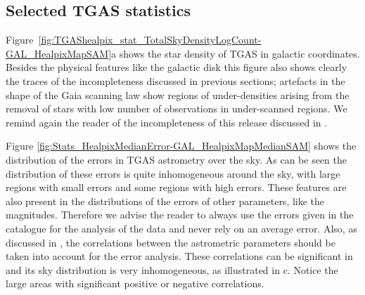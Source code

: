 

%



\subsection{Selected TGAS statistics}

Figure~\ref{fig:TGAShealpix_stat_TotalSkyDensityLogCount-GAL_HealpixMapSAM}a shows the star density of TGAS in galactic coordinates. Besides the physical features like the galactic disk this figure also shows clearly the traces of the incompleteness discussed in previous sections; artefacts in the shape of the Gaia scanning law show regions of under-densities arising from the removal of stars with low number of observations in under-scanned regions. We remind again the reader of the incompleteness of this release discussed in .


Figure \ref{fig:Stats_HealpixMedianError-GAL_HealpixMapMedianSAM} shows the distribution of the errors in TGAS astrometry over the sky. As can be seen the distribution of these errors is quite inhomogeneous around the sky, with large regions with small errors and some regions with high errors. These features are also present in the distributions of the errors of other parameters, like the magnitudes. Therefore we advise the reader to always use the errors given in the catalogue for the analysis of the data and never rely on an average error. Also, as discussed in 
, the correlations between the astrometric parameters should be taken into account for the error analysis. These correlations can be significant in {} and its sky distribution is very inhomogeneous, as illustrated in c. Notice the large areas with significant positive or negative correlations. 

